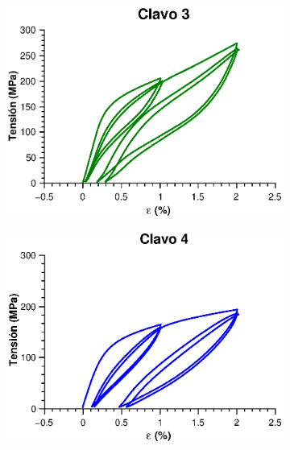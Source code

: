 \documentclass[a4paper,12pt,fleqn,twoside,openany]{book}
\begin{document}
  \begin{figure}%
    \centering
    
    ~ %
    \begin{subfigure}{0.45\textwidth}
        \includegraphics[width=\textwidth]{Img/Resultados/clavos/Clavo3Comp.eps}
    \end{subfigure}
        \begin{subfigure}{0.45\textwidth}
        \includegraphics[width=\textwidth]{Img/Resultados/clavos/Clavo4Comp.eps}
    \end{subfigure}

\end{figure}
\end{document}
